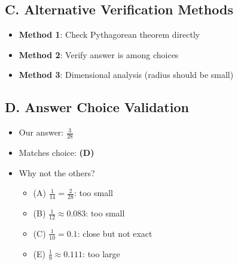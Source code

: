\documentclass[11pt]{article}
\begin{document}
\begin{verificationbox}
\subsection*{C. Alternative Verification Methods}
\begin{itemize}[leftmargin=*]
    \item \textbf{Method 1}: Check Pythagorean theorem directly
    \item \textbf{Method 2}: Verify answer is among choices
    \item \textbf{Method 3}: Dimensional analysis (radius should be small)
\end{itemize}

\subsection*{D. Answer Choice Validation}
\begin{itemize}[leftmargin=*]
    \item Our answer: $\frac{3}{28}$
    \item Matches choice: \textbf{(D)}
    \item Why not the others?
    \begin{itemize}
        \item (A) $\frac{1}{14} = \frac{2}{28}$: too small
        \item (B) $\frac{1}{12} \approx 0.083$: too small
        \item (C) $\frac{1}{10} = 0.1$: close but not exact
        \item (E) $\frac{1}{9} \approx 0.111$: too large
    \end{itemize}
\end{itemize}
\end{verificationbox}
\end{document}
